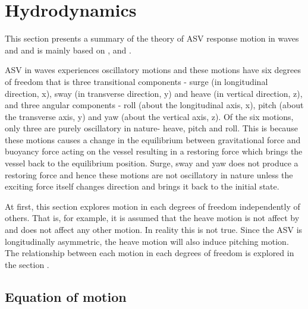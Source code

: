\section{Hydrodynamics} \label{Hydrodynamics}
This section presents a summary of the theory of ASV response motion in waves
and and is mainly based on \cite{lewis1988principles},
\cite{bhattacharyya1978dynamics} and \cite{barltrop2013dynamics}.

ASV in waves experiences oscillatory motions and these motions have six degrees
of freedom that is three transitional components - surge (in longitudinal
direction, x), sway (in transverse direction, y) and heave (in vertical
direction, z), and three angular components - roll (about the longitudinal axis,
x), pitch (about the transverse axis, y) and yaw (about the vertical axis, z).
Of the six motions, only three are purely oscillatory in nature- heave, pitch
and roll. This is because these motions causes a change in the equilibrium
between gravitational force and buoyancy force acting on the vessel resulting in
a restoring force which brings the vessel back to the equilibrium position.
Surge, sway and yaw does not produce a restoring force and hence these motions
are not oscillatory in nature unless the exciting force itself changes direction
and brings it back to the initial state.

At first, this section explores motion in each degrees of freedom independently
of others. That is, for example, it is assumed that the heave motion is not
affect by and does not affect any other motion. In reality this is not true.
Since the ASV is longitudinally asymmetric, the heave motion will also induce
pitching motion. The relationship between each motion in each degrees of freedom
is explored in the section .

\subsection{Equation of motion}

